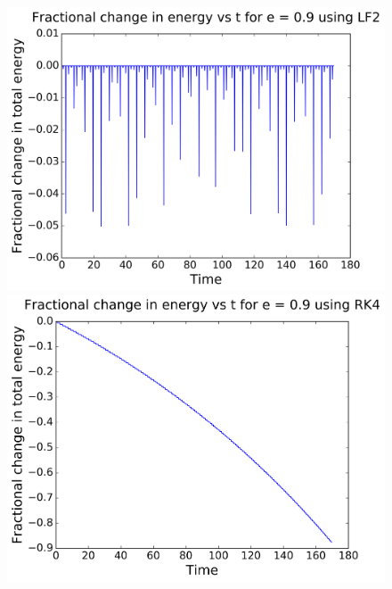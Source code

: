 \begin{figure}[H]
	\centering
	\begin{minipage}[b]{0.48\linewidth}
		\includegraphics[width=\linewidth]{plots_p1/LF2_e09_energy.png}
	\end{minipage}
	\begin{minipage}[b]{0.48\linewidth}
		\includegraphics[width=\linewidth]{plots_p1/RK4_e09_energy.png}
	\end{minipage}
\end{figure}



